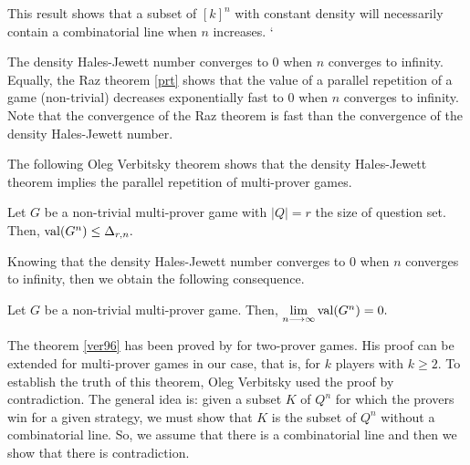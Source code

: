  
This result shows that  a subset of $[k]^n$ with constant density 
will  necessarily contain  a combinatorial line when $n$ increases.
`

The density Hales-Jewett number converges to $0$ when $n$ converges to infinity. Equally, the Raz theorem \eqref{prt} shows that the value of a parallel repetition of a game (non-trivial) decreases exponentially  fast to $0$ when $n$ converges to infinity.  Note that the convergence of the Raz theorem is fast than the convergence of the  density Hales-Jewett number.
  
The following Oleg Verbitsky theorem  shows that the density Hales-Jewett theorem implies the parallel repetition of multi-prover games.

\begin{thm}	 Let $G$ be a non-trivial multi-prover game with $|Q|=r$ the size of question set. Then, 
  $\mathrm{val} (G^n) \leq \Delta_{r,n}.$	\label{ver96} \end{thm}

Knowing that the density Hales-Jewett number converges to $0$ when $n$ converges to infinity, then we obtain the following consequence.
\begin{cor}	Let $G$ be a non-trivial multi-prover game. Then, $\lim\limits_{n\longrightarrow \infty} \mathrm{val} (G^n)=0.$ 	\end{cor}

The theorem \eqref{ver96}  has been proved by \cite{verbitsky1996towards} for two-prover games.  His proof can be extended for  multi-prover games in our case,  that is, for $k$ players with $k\geq 2.$ To establish the truth of  this theorem, Oleg Verbitsky used the proof by contradiction. The general idea is: given a subset $K$ of $Q^n$ for which the provers win   for a given strategy, we must show that $K$ is  the subset  of $Q^n$ without a combinatorial line.
So, we assume that there is a combinatorial line and then we show that there is  contradiction.

